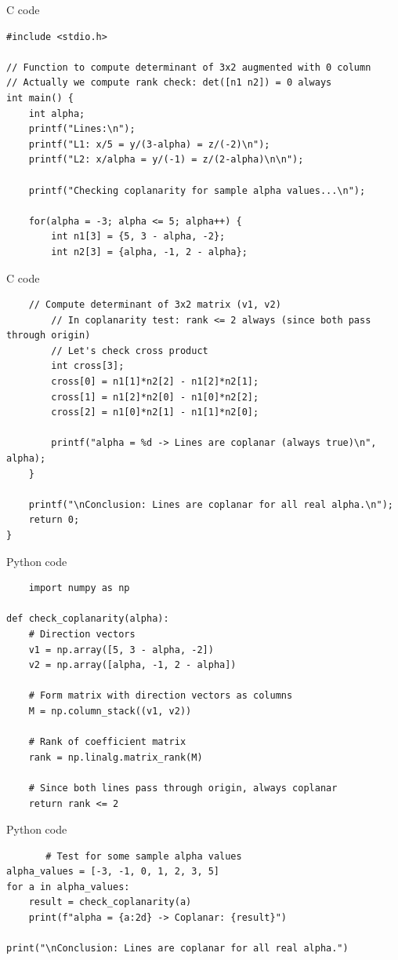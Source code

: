 \documentclass{beamer}
\begin{document}
\begin{frame}[fragile]{C code}
\begin{lstlisting}
#include <stdio.h>

// Function to compute determinant of 3x2 augmented with 0 column
// Actually we compute rank check: det([n1 n2]) = 0 always
int main() {
    int alpha;
    printf("Lines:\n");
    printf("L1: x/5 = y/(3-alpha) = z/(-2)\n");
    printf("L2: x/alpha = y/(-1) = z/(2-alpha)\n\n");

    printf("Checking coplanarity for sample alpha values...\n");

    for(alpha = -3; alpha <= 5; alpha++) {
        int n1[3] = {5, 3 - alpha, -2};
        int n2[3] = {alpha, -1, 2 - alpha};
\end{lstlisting}
\end{frame}

\begin{frame}[fragile]{C code}
\begin{lstlisting}
    // Compute determinant of 3x2 matrix (v1, v2)
        // In coplanarity test: rank <= 2 always (since both pass through origin)
        // Let's check cross product
        int cross[3];
        cross[0] = n1[1]*n2[2] - n1[2]*n2[1];
        cross[1] = n1[2]*n2[0] - n1[0]*n2[2];
        cross[2] = n1[0]*n2[1] - n1[1]*n2[0];

        printf("alpha = %d -> Lines are coplanar (always true)\n", alpha);
    }

    printf("\nConclusion: Lines are coplanar for all real alpha.\n");
    return 0;
}
\end{lstlisting}
\end{frame}

\begin{frame}[fragile]{Python code}
\begin{lstlisting}
    import numpy as np

def check_coplanarity(alpha):
    # Direction vectors
    v1 = np.array([5, 3 - alpha, -2])
    v2 = np.array([alpha, -1, 2 - alpha])

    # Form matrix with direction vectors as columns
    M = np.column_stack((v1, v2))

    # Rank of coefficient matrix
    rank = np.linalg.matrix_rank(M)

    # Since both lines pass through origin, always coplanar
    return rank <= 2
\end{lstlisting}
\end{frame}

\begin{frame}[fragile]{Python code}
    \begin{lstlisting}
       # Test for some sample alpha values
alpha_values = [-3, -1, 0, 1, 2, 3, 5]
for a in alpha_values:
    result = check_coplanarity(a)
    print(f"alpha = {a:2d} -> Coplanar: {result}")

print("\nConclusion: Lines are coplanar for all real alpha.") 
    \end{lstlisting}
\end{frame}
\end{document}
